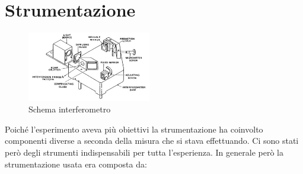 \documentclass[a4paper,11pt]{article}
\begin{document}
	\section{Strumentazione} \label{strum}
\begin{figure}
	\caption{Schema interferometro}\label{interf}
	\centering
	\includegraphics[width=0.48\textwidth]{interf}
\end{figure}
Poiché l'esperimento aveva più obiettivi la strumentazione ha coinvolto componenti diverse a seconda della misura che si stava effettuando. Ci sono stati però degli strumenti indispensabili per tutta l'esperienza. In generale però la strumentazione usata era composta da:
\end{document}
